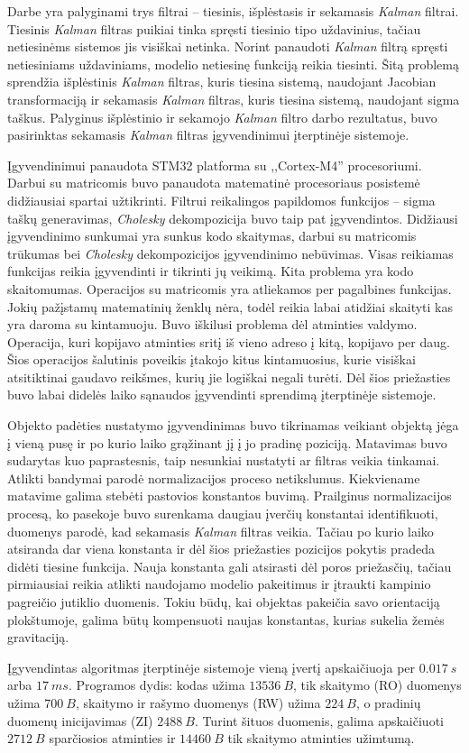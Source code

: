 Darbe yra palyginami trys filtrai -- tiesinis, išplėstasis ir sekamasis \textit{Kalman} filtrai.
Tiesinis \textit{Kalman} filtras puikiai tinka spręsti tiesinio tipo uždavinius, tačiau netiesinėms sistemos jis visiškai netinka.
Norint panaudoti \textit{Kalman} filtrą spręsti netiesiniams uždaviniams, modelio netiesinę funkciją reikia tiesinti.
Šitą problemą sprendžia išplėstinis \textit{Kalman} filtras, kuris tiesina sistemą, naudojant Jacobian transformaciją ir sekamasis \textit{Kalman} filtras, kuris tiesina sistemą, naudojant sigma taškus.
Palyginus išplėstinio ir sekamojo \textit{Kalman} filtro darbo rezultatus, buvo pasirinktas sekamasis \textit{Kalman} filtras įgyvendinimui įterptinėje sistemoje.

Įgyvendinimui panaudota STM32 platforma su ,,Cortex-M4'' procesoriumi.
Darbui su matricomis buvo panaudota matematinė procesoriaus posistemė didžiausiai spartai užtikrinti.
Filtrui reikalingos papildomos funkcijos -- sigma taškų generavimas, \textit{Cholesky} dekompozicija buvo taip pat įgyvendintos.
Didžiausi įgyvendinimo sunkumai yra sunkus kodo skaitymas, darbui su matricomis trūkumas bei \textit{Cholesky} dekompozicijos įgyvendinimo nebūvimas.
Visas reikiamas funkcijas reikia įgyvendinti ir tikrinti jų veikimą.
Kita problema yra kodo skaitomumas.
Operacijos su matricomis yra atliekamos per pagalbines funkcijas.
Jokių pažįstamų matematinių ženklų nėra, todėl reikia labai atidžiai skaityti kas yra daroma su kintamuoju.
Buvo iškilusi problema dėl atminties valdymo.
Operacija, kuri kopijavo atminties sritį iš vieno adreso į kitą, kopijavo per daug.
Šios operacijos šalutinis poveikis įtakojo kitus kintamuosius, kurie visiškai atsitiktinai gaudavo reikšmes, kurių jie logiškai negali turėti.
Dėl šios priežasties buvo labai didelės laiko sąnaudos įgyvendinti sprendimą įterptinėje sistemoje.

Objekto padėties nustatymo įgyvendinimas buvo tikrinamas veikiant objektą jėga į vieną pusę ir po kurio laiko grąžinant jį į jo pradinę poziciją.
Matavimas buvo sudarytas kuo paprastesnis, taip nesunkiai nustatyti ar filtras veikia tinkamai.
Atlikti bandymai parodė normalizacijos proceso netikslumus.
Kiekviename matavime galima stebėti pastovios konstantos buvimą.
Prailginus normalizacijos procesą, ko pasekoje buvo surenkama daugiau įverčių konstantai identifikuoti, duomenys parodė, kad sekamasis \textit{Kalman} filtras veikia.
Tačiau po kurio laiko atsiranda dar viena konstanta ir dėl šios priežasties pozicijos pokytis pradeda didėti tiesine funkcija.
Nauja konstanta gali atsirasti dėl poros priežasčių, tačiau pirmiausiai reikia atlikti naudojamo modelio pakeitimus ir įtraukti kampinio pagreičio jutiklio duomenis.
Tokiu būdų, kai objektas pakeičia savo orientaciją plokštumoje, galima būtų kompensuoti naujas konstantas, kurias sukelia žemės gravitaciją.

Įgyvendintas algoritmas įterptinėje sistemoje vieną įvertį apskaičiuoja per $0.017~s$ arba $17~ms$.
Programos dydis: kodas užima $13536~B$, tik skaitymo (RO) duomenys užima $700~B$, skaitymo ir rašymo duomenys (RW) užima $224~B$, o pradinių duomenų inicijavimas (ZI) $2488~B$.
Turint šituos duomenis, galima apskaičiuoti $2712~B$ sparčiosios atminties ir $14460~B$ tik skaitymo atminties užimtumą.


